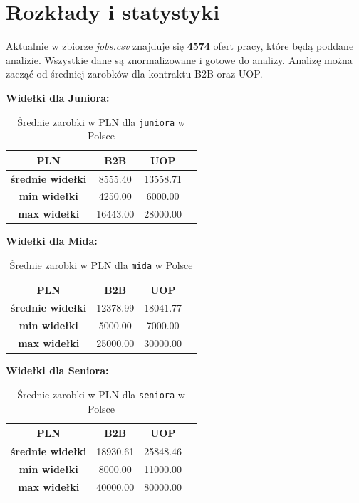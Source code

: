 \documentclass[a4paper]{article}
\begin{document}
\newpage

\section{Rozkłady i statystyki}

\quad Aktualnie w zbiorze \textit{jobs.csv} znajduje się \textbf{4574} ofert pracy, które będą poddane
analizie. Wszystkie dane są znormalizowane i gotowe do analizy. Analizę można zacząć od średniej zarobków
dla kontraktu B2B oraz UOP.


\textbf{Widełki dla Juniora: }

\begin{table}[h]
    \centering
    \begin{tabular}{|c|c|c|c|}
        \hline
        \textbf{PLN}             & \textbf{B2B} & \textbf{UOP} \\ \hline
        \textbf{średnie widełki} & 8555.40      & 13558.71     \\ \hline
        \textbf{min widełki}     & 4250.00      & 6000.00      \\ \hline
        \textbf{max widełki}     & 16443.00     & 28000.00     \\ \hline
    \end{tabular}
    \caption{Średnie zarobki w PLN dla \texttt{juniora} w Polsce}
\end{table}

\textbf{Widełki dla Mida: }

\begin{table}[h]
    \centering
    \begin{tabular}{|c|c|c|c|}
        \hline
        \textbf{PLN}             & \textbf{B2B} & \textbf{UOP} \\ \hline
        \textbf{średnie widełki} & 12378.99     & 18041.77     \\ \hline
        \textbf{min widełki}     & 5000.00      & 7000.00      \\ \hline
        \textbf{max widełki}     & 25000.00     & 30000.00     \\ \hline
    \end{tabular}
    \caption{Średnie zarobki w PLN dla \texttt{mida} w Polsce}
\end{table}

\textbf{Widełki dla Seniora: }

\begin{table}[h]
    \centering
    \begin{tabular}{|c|c|c|c|}
        \hline
        \textbf{PLN}             & \textbf{B2B} & \textbf{UOP} \\ \hline
        \textbf{średnie widełki} & 18930.61     & 25848.46     \\ \hline
        \textbf{min widełki}     & 8000.00      & 11000.00     \\ \hline
        \textbf{max widełki}     & 40000.00     & 80000.00     \\ \hline
    \end{tabular}
    \caption{Średnie zarobki w PLN dla \texttt{seniora} w Polsce}
\end{table}
\newpage
\end{document}
